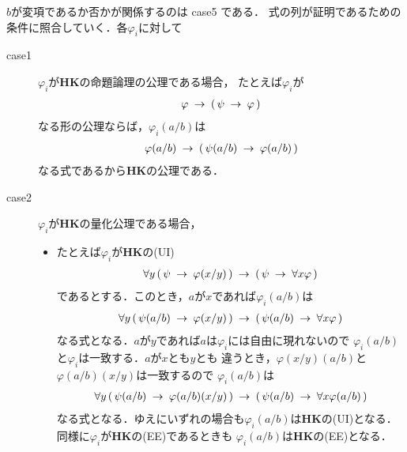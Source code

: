 	\begin{metaprf}
		$b$が変項であるか否かが関係するのは case5 である．
		式の列が証明であるための条件に照合していく．各$\varphi_{i}$に対して
		\begin{description}
			\item[case1] $\varphi_{i}$が{\bf HK}の命題論理の公理である場合，
				たとえば$\varphi_{i}$が
				\begin{align}
					\varphi \hspace{0.25em}\rightarrow\hspace{0.25em} (\, \psi \hspace{0.25em}\rightarrow\hspace{0.25em} \varphi\, )
				\end{align}
				なる形の公理ならば，$\varphi_{i}(a/b)$は
				\begin{align}
					\varphi(a/b) \hspace{0.25em}\rightarrow\hspace{0.25em} (\, \psi(a/b) \hspace{0.25em}\rightarrow\hspace{0.25em} \varphi(a/b)\, )
				\end{align}
				なる式であるから{\bf HK}の公理である．
				
			\item[case2] $\varphi_{i}$が{\bf HK}の量化公理である場合，
				\begin{itemize}
					\item たとえば$\varphi_{i}$が{\bf HK}の(UI)
						\begin{align}
							\forall y\, (\, \psi \hspace{0.25em}\rightarrow\hspace{0.25em} \varphi(x/y)\, )
							\hspace{0.25em}\rightarrow\hspace{0.25em} (\, \psi \hspace{0.25em}\rightarrow\hspace{0.25em} \forall x \varphi\, )
						\end{align}
						であるとする．このとき，$a$が$x$であれば$\varphi_{i}(a/b)$は
						\begin{align}
							\forall y\, (\, \psi(a/b) \hspace{0.25em}\rightarrow\hspace{0.25em} \varphi(x/y)\, )
							\hspace{0.25em}\rightarrow\hspace{0.25em} (\, \psi(a/b) \hspace{0.25em}\rightarrow\hspace{0.25em} \forall x \varphi\, )
						\end{align}
						なる式となる．$a$が$y$であれば$a$は$\varphi_{i}$には自由に現れないので
						$\varphi_{i}(a/b)$と$\varphi_{i}$は一致する．$a$が$x$とも$y$とも
						違うとき，$\varphi(x/y)(a/b)$と$\varphi(a/b)(x/y)$は一致するので
						$\varphi_{i}(a/b)$は
						\begin{align}
							\forall y\, (\, \psi(a/b) \hspace{0.25em}\rightarrow\hspace{0.25em} \varphi(a/b)(x/y)\, )
							\hspace{0.25em}\rightarrow\hspace{0.25em} (\, \psi(a/b) \hspace{0.25em}\rightarrow\hspace{0.25em} \forall x \varphi(a/b)\, )
						\end{align}
						なる式となる．ゆえにいずれの場合も$\varphi_{i}(a/b)$は{\bf HK}の(UI)となる．
						同様に$\varphi_{i}$が{\bf HK}の(EE)であるときも
						$\varphi_{i}(a/b)$は{\bf HK}の(EE)となる．
				

\end{itemize}
\end{description}
\end{metaprf}
